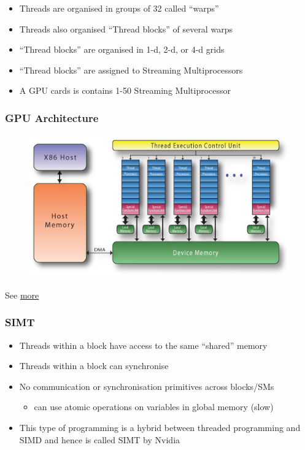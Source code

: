 \begin{itemize}
\itemsep1pt\parskip0pt
\item
  Threads are organised in groups of 32 called ``warps''
\item
  Threads also organised ``Thread blocks'' of several warps
\item
  ``Thread blocks'' are organised in 1-d, 2-d, or 4-d grids
\item
  ``Thread blocks'' are assigned to Streaming Multiprocessors
\item
  A GPU cards is contains 1-50 Streaming Multiprocessor
\end{itemize}

\subsubsection{GPU Architecture}\label{gpu-architecture}

\begin{figure}[htbp]
\centering
\includegraphics{09Accelerators/figures/pgi-nvidia-block-diagram.png}
\end{figure}

See
\href{http://www.gris.informatik.tu-darmstadt.de/cuda-workshop/tutorial/Advanced_CUDA_01.pdf}{more}

\subsubsection{SIMT}\label{simt}

\begin{itemize}
\itemsep1pt\parskip0pt
\item
  Threads within a block have access to the same ``shared'' memory
\item
  Threads within a block can synchronise
\item
  No communication or synchronisation primitives across blocks/SMs

  \begin{itemize}
  \itemsep1pt\parskip0pt
  \item
    can use atomic operations on variables in global memory (slow)
  \end{itemize}
\item
  This type of programming is a hybrid between threaded programming and
  SIMD and hence is called SIMT by Nvidia
\end{itemize}

